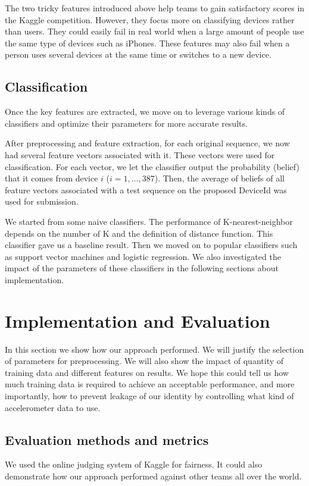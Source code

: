 \documentclass{article} %
\begin{document}
The two tricky features introduced above help teams to gain satisfactory scores in the Kaggle competition. However, they focus more on classifying devices rather than users. They could easily fail in real world when a large amount of people use the same type of devices such as iPhones. These features may also fail when a person uses several devices at the same time or switches to a new device.

\subsection{Classification}

Once the key features are extracted, we move on to leverage various kinds of classifiers and optimize their parameters for more accurate results.

After preprocessing and feature extraction, for each original sequence, we now had several feature vectors associated with it. These vectors were used for classification. For each vector, we let the classifier output the probability (belief) that it comes from device $i$ ($i=1,\ldots,387$). Then, the average of beliefs of all feature vectors associated with a test sequence on the proposed DeviceId was used for submission.

We started from some naive classifiers. The performance of K-nearest-neighbor depends on the number of K and the definition of distance function. This classifier gave us a baseline result. Then we moved on to popular classifiers such as support vector machines and logistic regression. We also investigated the impact of the parameters of these classifiers in the following sections about implementation.


\section{Implementation and Evaluation}
In this section we show how our approach performed. We will justify the selection of parameters for preprocessing. We will also show the impact of quantity of training data and different features on results. We hope this could tell us how much training data is required to achieve an acceptable performance, and more importantly, how to prevent leakage of our identity by controlling what kind of accelerometer data to use.

\subsection{Evaluation methods and metrics}
We used the online judging system of Kaggle for fairness. It could also demonstrate how our approach performed against other teams all over the world. 
\end{document}

